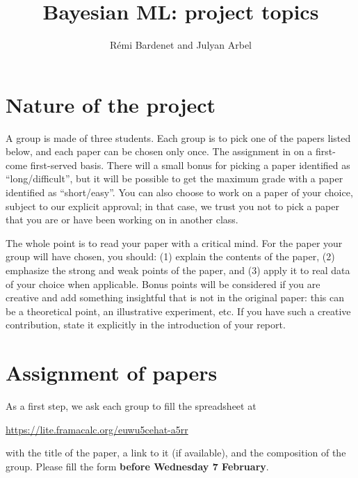 \documentclass[12pt]{article}%
\begin{document}
\title{Bayesian ML: project topics}
\author{R\'emi Bardenet and Julyan Arbel}
\maketitle

\section{Nature of the project}
A group is made of three students.
Each group is to pick one of the papers listed below, and each paper can be chosen only once.
The assignment in on a first-come first-served basis.
There will a small bonus for picking a paper identified as ``long/difficult'', but it will be possible to get the maximum grade with a paper identified as ``short/easy''.
You can also choose to work on a paper of your choice, subject to our explicit approval; in that case, we trust you not to pick a paper that you are or have been working on in another class.

The whole point is to read your paper with a critical mind. 
For the paper your group will have chosen, you should: (1) explain the contents of the paper, (2) emphasize the strong and weak points of the paper, and (3) apply it to real data of your choice when applicable. 
Bonus points will be considered if you are creative and add something insightful that is not in the original paper: this can be a theoretical point, an illustrative experiment, etc. 
If you have such a creative contribution, state it explicitly in the introduction of your report.

\section{Assignment of papers}
As a first step, we ask each group to fill the spreadsheet at
\begin{center}
   \href{https://lite.framacalc.org/euwu5cehat-a5rr}{https://lite.framacalc.org/euwu5cehat-a5rr}
 \end{center}
with the title of the paper, a link to it (if available), and the composition of the group.
Please fill the form {\bf before Wednesday 7 February}. 
\end{document}
